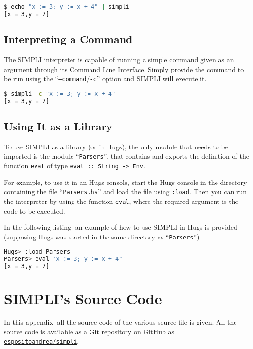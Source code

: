 \documentclass{esposito-documentation}
\begin{document}
\begin{lstlisting}[language=sh,numbers=none]
$ echo "x := 3; y := x + 4" | simpli
[x = 3,y = 7]
\end{lstlisting}

\section{Interpreting a Command}

The SIMPLI interpreter is capable of running a simple command given as an
argument through its Command Line Interface. Simply provide the command to be
run using the ``\texttt{--command}/\texttt{-c}'' option and SIMPLI will execute
it.

\begin{lstlisting}[language=sh,numbers=none]
$ simpli -c "x := 3; y := x + 4"
[x = 3,y = 7]
\end{lstlisting}

\section{Using It as a Library}

To use SIMPLI as a library (or in Hugs), the only module that needs to be
imported is the module ``\texttt{Parsers}'', that contains and exports the
definition of the function \texttt{eval} of type
\lstinline|eval :: String -> Env|.

For example, to use it in an Hugs console, start the Hugs console in the
directory containing the file ``\texttt{Parsers.hs}'' and load the file using
\texttt{:load}. Then you can run the interpreter by using the function
\texttt{eval}, where the required argument is the code to be executed.

In the following listing, an example of how to use SIMPLI in Hugs is provided
(supposing Hugs was started in the same directory as ``\texttt{Parsers}'').

\begin{lstlisting}[language=sh,numbers=none]
Hugs> :load Parsers
Parsers> eval "x := 3; y := x + 4"
[x = 3,y = 7]
\end{lstlisting}

\appendix
\chapter{SIMPLI's Source Code}\label{app:source}

In this appendix, all the source code of the various source file is given. All
the source code is available as a Git repository on GitHub as
\href{https://github.com/espositoandrea/simpli}{\texttt{espositoandrea/simpli}}.
\end{document}
